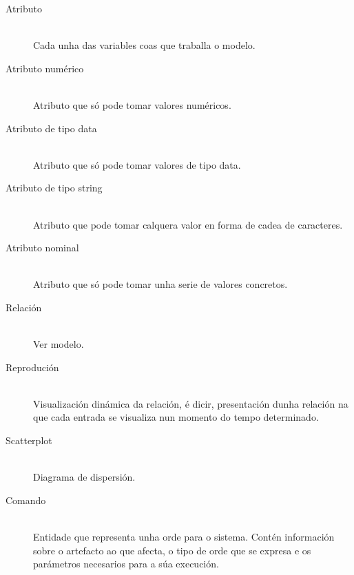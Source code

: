 \begin{description}
	\item[Atributo] \hfill \\
  Cada unha das variables coas que traballa o modelo.
	\item[Atributo numérico] \hfill \\
  Atributo que só pode tomar valores numéricos.
	\item[Atributo de tipo data] \hfill \\
  Atributo que só pode tomar valores de tipo data.
	\item[Atributo de tipo string] \hfill \\
  Atributo que pode tomar calquera valor en forma de cadea de caracteres.
	\item[Atributo nominal] \hfill \\
  Atributo que só pode tomar unha serie de valores concretos.
	\item[Relación] \hfill \\
 Ver modelo.
\item[Reprodución] \hfill \\
 Visualización dinámica da relación, é dicir, presentación dunha relación na que cada entrada se visualiza nun momento do tempo determinado.
\item[Scatterplot] \hfill \\
 Diagrama de dispersión.
\item[Comando] \hfill \\
 Entidade que representa unha orde para o sistema. Contén información sobre o artefacto ao que afecta, o tipo de orde que se expresa e os parámetros necesarios para a súa execución.
\end{description}